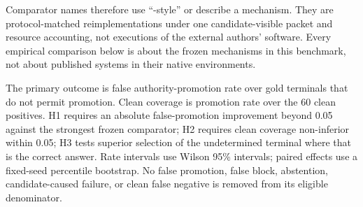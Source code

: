 Comparator names therefore use ``-style'' or describe a mechanism. They are protocol-matched reimplementations under one candidate-visible packet and resource accounting, not executions of the external authors' software. Every empirical comparison below is about the frozen mechanisms in this benchmark, not about published systems in their native environments.

The primary outcome is false authority-promotion rate over gold terminals that do not permit promotion. Clean coverage is promotion rate over the 60 clean positives. H1 requires an absolute false-promotion improvement beyond 0.05 against the strongest frozen comparator; H2 requires clean coverage non-inferior within 0.05; H3 tests superior selection of the undetermined terminal where that is the correct answer. Rate intervals use Wilson 95\% intervals; paired effects use a fixed-seed percentile bootstrap. No false promotion, false block, abstention, candidate-caused failure, or clean false negative is removed from its eligible denominator.
